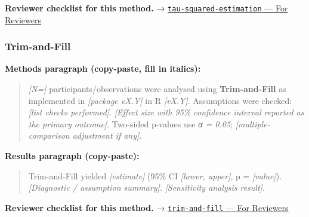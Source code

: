 \documentclass[
]{article}
\begin{document}
\textbf{Reviewer checklist for this method.} →
\href{../chapters/15-metaanalysis/tau-squared-estimation.Rmd\#for-reviewers}{\texttt{tau-squared-estimation}
--- For Reviewers}

\subsubsection{Trim-and-Fill}\label{trim-and-fill}

\textbf{Methods paragraph (copy-paste, fill in italics):}

\begin{quote}
\emph{{[}N={]}} participants/observations were analysed using
\textbf{Trim-and-Fill} as implemented in \emph{{[}package vX.Y{]}} in R
\emph{{[}vX.Y{]}}. Assumptions were checked: \emph{{[}list checks
performed{]}}. \emph{{[}Effect size with 95\% confidence interval
reported as the primary outcome{]}}. Two-sided p-values use \emph{α =
0.05}; \emph{{[}multiple-comparison adjustment if any{]}}.
\end{quote}

\textbf{Results paragraph (copy-paste):}

\begin{quote}
Trim-and-Fill yielded \emph{{[}estimate{]}} (95\% CI \emph{{[}lower,
upper{]}}, p = \emph{{[}value{]}}). \emph{{[}Diagnostic / assumption
summary{]}}. \emph{{[}Sensitivity analysis result{]}}.
\end{quote}

\textbf{Reviewer checklist for this method.} →
\href{../chapters/15-metaanalysis/trim-and-fill.Rmd\#for-reviewers}{\texttt{trim-and-fill}
--- For Reviewers}
\end{document}
